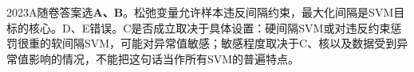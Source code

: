 2023A随卷答案选\textbf{A、B}。松弛变量允许样本违反间隔约束，最大化间隔是SVM目标的核心。D、E错误。C是否成立取决于具体设置：硬间隔SVM或对违反约束惩罚很重的软间隔SVM，可能对异常值敏感；敏感程度取决于C、核以及数据受到异常值影响的情况，不能把这句话当作所有SVM的普遍特点。
